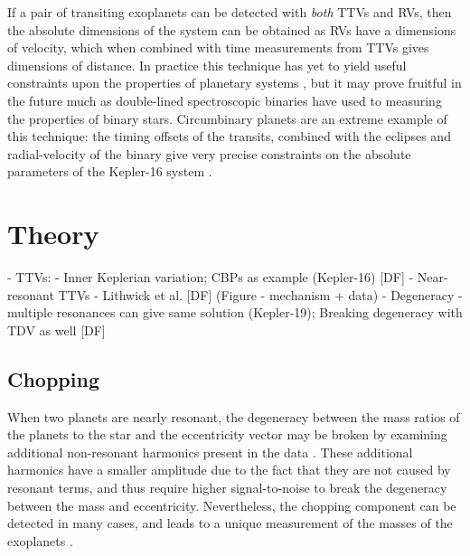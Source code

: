 \documentclass[graybox,natbib,nosecnum]{svmult}
\begin{document}
If a pair of transiting exoplanets can be detected with {\it both} TTVs and RVs, then the
absolute dimensions of the system can be obtained \citep{2005MNRAS.359..567A,
2013ApJ...762..112M} as RVs have a dimensions of velocity, which 
when combined with time measurements from TTVs gives dimensions of distance.
In practice this technique has yet to yield useful constraints upon the properties
of planetary systems \citep{2015MNRAS.453.2644A}, but it may prove fruitful
in the future much as double-lined spectroscopic binaries have used to measuring 
the properties of binary stars.  Circumbinary planets are an extreme example
of this technique: the timing offsets of the transits, combined with the eclipses
and radial-velocity of the binary give very precise constraints on the absolute parameters
of the Kepler-16 system \citep{2011Sci...333.1602D}.


\section{Theory} %
  - TTVs:
    - Inner Keplerian variation;  CBPs as example (Kepler-16) [DF]
    - Near-resonant TTVs - Lithwick et al.  [DF] (Figure - mechanism + data)
       - Degeneracy - multiple resonances can give same solution (Kepler-19); Breaking degeneracy with TDV as well [DF]
\subsection{Chopping}

When two planets are nearly resonant, the degeneracy between the mass ratios of the planets to the star
and the eccentricity vector may be broken by examining additional non-resonant harmonics present in the data \citep{2015ApJ...802..116D}.
These additional harmonics have a smaller amplitude due to the fact that they are not caused by resonant terms,
and thus require higher signal-to-noise to break the degeneracy between the mass and eccentricity.
Nevertheless, the chopping component can be detected in many cases, and leads to a unique measurement
of the masses of the exoplanets \citep{2014ApJ...795..167S,2015ApJ...802..116D}.
\end{document}
